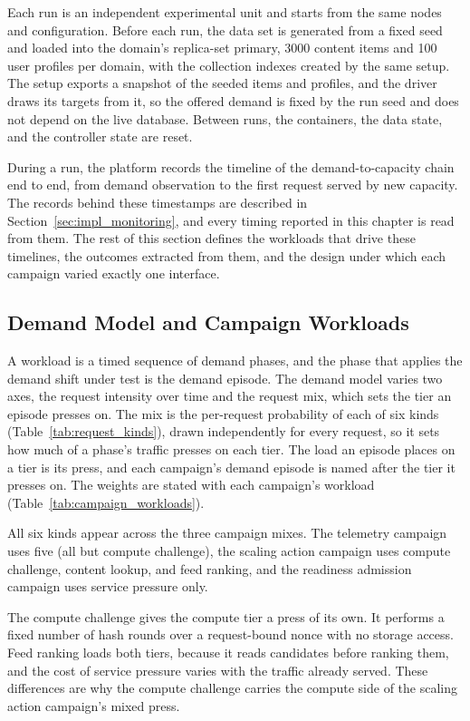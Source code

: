 ﻿\documentclass[12pt,reqno,twoside]{amsbook}
\begin{document}
Each run is an independent experimental unit and starts from the same nodes
and configuration. Before each run, the data set is generated from a fixed
seed and loaded into the domain's replica-set primary, 3000 content items and
100 user profiles per domain, with the collection indexes created by the same
setup. The setup exports a snapshot of the seeded items and profiles, and the
driver draws its targets from it, so the offered demand is fixed by the run
seed and does not depend on the live database. Between runs, the containers,
the data state, and the controller state are reset.

During a run, the platform records the timeline of the demand-to-capacity
chain end to end, from demand observation to the first request served by new
capacity. The records behind these timestamps are described in
Section~\ref{sec:impl_monitoring}, and every timing reported in this chapter is
read from them. The rest of this section defines the
workloads that drive these timelines, the outcomes extracted from them,
and the design under which each campaign varied exactly one interface.

\subsection{Demand Model and Campaign Workloads}
A workload is a timed sequence of demand phases, and the phase that applies the
demand shift under test is the demand episode. The demand model varies two axes,
the request intensity over time and the request mix, which sets the tier an
episode presses on. The mix is the per-request probability of each of six kinds
(Table~\ref{tab:request_kinds}), drawn independently for every request, so it
sets how much of a phase's traffic presses on each tier. The load an episode
places on a tier is its press, and each campaign's demand episode is named after
the tier it presses on. The weights are stated with each campaign's workload
(Table~\ref{tab:campaign_workloads}).

All six kinds appear across the three campaign mixes. The telemetry campaign
uses five (all but compute challenge), the scaling action campaign uses
compute challenge, content lookup, and feed ranking, and the readiness
admission campaign uses service pressure only.

    The compute challenge gives the compute tier a press of its own. It performs
a fixed number of hash rounds over a request-bound nonce with no storage access. Feed
ranking loads both tiers, because it reads candidates before ranking them, and
the cost of service pressure varies with the traffic already served. These
differences are why the compute challenge carries the compute side of the
scaling action campaign's mixed press.
\end{document}
